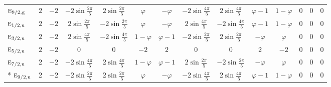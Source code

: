 \documentclass[10pt,a4paper]{article}
\numberwithin{equation}{section}
\newcommand{\irr}[1]{\text{\normalfont\scshape #1}}
\newcommand{\ptag}[1]{\mathrm{#1}}
\newcommand{\goldenratio}{\varphi}
\begin{document}
{{\begin{longtable}{@{}lccccccccccccc@{}}
$\irr{e}_{9/2,\ptag{g}}$ & $2$ & $-2$ & $-2\sin\tfrac{2\pi}{5}$ & $2\sin\tfrac{2\pi}{5}$ & $\goldenratio{}$ & $-\goldenratio{}$ & $-2\sin\tfrac{4\pi}{5}$ & $2\sin\tfrac{4\pi}{5}$ & $\goldenratio - 1$ & $1 - \goldenratio{}$ & $0$ & $0$ & $0$\\
$\irr{e}_{1/2,\ptag{u}}$ & $2$ & $-2$ & $2\sin\tfrac{2\pi}{5}$ & $-2\sin\tfrac{2\pi}{5}$ & $\goldenratio{}$ & $-\goldenratio{}$ & $2\sin\tfrac{4\pi}{5}$ & $-2\sin\tfrac{4\pi}{5}$ & $\goldenratio - 1$ & $1 - \goldenratio{}$ & $0$ & $0$ & $0$\\
$\irr{e}_{3/2,\ptag{u}}$ & $2$ & $-2$ & $2\sin\tfrac{4\pi}{5}$ & $-2\sin\tfrac{4\pi}{5}$ & $1 - \goldenratio{}$ & $\goldenratio - 1$ & $-2\sin\tfrac{2\pi}{5}$ & $2\sin\tfrac{2\pi}{5}$ & $-\goldenratio{}$ & $\goldenratio{}$ & $0$ & $0$ & $0$\\
$\irr{e}_{5/2,\ptag{u}}$ & $2$ & $-2$ & $0$ & $0$ & $-2$ & $2$ & $0$ & $0$ & $2$ & $-2$ & $0$ & $0$ & $0$\\
$\irr{e}_{7/2,\ptag{u}}$ & $2$ & $-2$ & $-2\sin\tfrac{4\pi}{5}$ & $2\sin\tfrac{4\pi}{5}$ & $1 - \goldenratio{}$ & $\goldenratio - 1$ & $2\sin\tfrac{2\pi}{5}$ & $-2\sin\tfrac{2\pi}{5}$ & $-\goldenratio{}$ & $\goldenratio{}$ & $0$ & $0$ & $0$\\*
$\irr{e}_{9/2,\ptag{u}}$ & $2$ & $-2$ & $-2\sin\tfrac{2\pi}{5}$ & $2\sin\tfrac{2\pi}{5}$ & $\goldenratio{}$ & $-\goldenratio{}$ & $-2\sin\tfrac{4\pi}{5}$ & $2\sin\tfrac{4\pi}{5}$ & $\goldenratio - 1$ & $1 - \goldenratio{}$ & $0$ & $0$ & $0$\\
\bottomrule\end{longtable}}}
\end{document}

